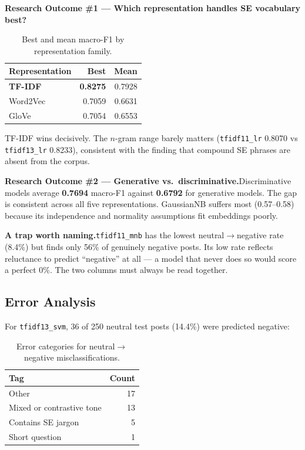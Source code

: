 \documentclass[11pt,a4paper]{article}
\begin{document}
\textbf{Research Outcome \#1 --- Which representation handles SE vocabulary best?}

\begin{table}[H]
\centering
\caption{Best and mean macro-F1 by representation family.}
\begin{tabular}{lrr}
\toprule
\textbf{Representation} & \textbf{Best} & \textbf{Mean} \\
\midrule
\textbf{TF-IDF} & \textbf{0.8275} & 0.7928 \\
Word2Vec        & 0.7059 & 0.6631 \\
GloVe           & 0.7054 & 0.6553 \\
\bottomrule
\end{tabular}
\end{table}

TF-IDF wins decisively. The $n$-gram range barely matters (\texttt{tfidf11\_lr} 0.8070 vs \texttt{tfidf13\_lr} 0.8233), consistent with the finding that compound SE phrases are absent from the corpus.

\textbf{Research Outcome \#2 --- Generative vs.\ discriminative.}\quad Discriminative models average \textbf{0.7694} macro-F1 against \textbf{0.6792} for generative models. The gap is consistent across all five representations. GaussianNB suffers most (0.57--0.58) because its independence and normality assumptions fit embeddings poorly.

\textbf{A trap worth naming.}\quad \texttt{tfidf11\_mnb} has the lowest neutral$\rightarrow$negative rate (8.4\%) but finds only 56\% of genuinely negative posts. Its low rate reflects reluctance to predict ``negative'' at all --- a model that never does so would score a perfect 0\%. The two columns must always be read together.

\subsection{Error Analysis}

For \texttt{tfidf13\_svm}, 36 of 250 neutral test posts (14.4\%) were predicted negative:

\begin{table}[H]
\centering
\caption{Error categories for neutral$\rightarrow$negative misclassifications.}
\begin{tabular}{lr}
\toprule
\textbf{Tag} & \textbf{Count} \\
\midrule
Other & 17 \\
Mixed or contrastive tone & 13 \\
Contains SE jargon & 5 \\
Short question & 1 \\
\bottomrule
\end{tabular}
\end{table}
\end{document}

